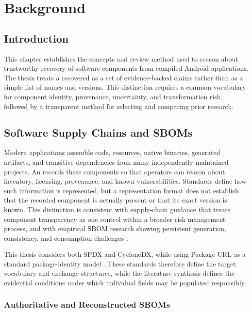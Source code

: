 \chapter[Background]{Background}
\label{ch:master-background}

\section{Introduction}

This chapter establishes the concepts and review method used to reason about
trustworthy recovery of software components from compiled Android
applications. The thesis treats a recovered \SBOM as a set of evidence-backed
claims rather than as a simple list of names and versions. This distinction
requires a common vocabulary for component identity, provenance, uncertainty,
and transformation risk, followed by a transparent method for selecting and
comparing prior research.

\section{Software Supply Chains and SBOMs}

Modern applications assemble code, resources, native binaries, generated
artifacts, and transitive dependencies from many independently maintained
projects. An \SBOM records these components so that operators can reason about
inventory, licensing, provenance, and known vulnerabilities. Standards define
how such information is represented, but a representation format does not
establish that the recorded component is actually present or that its exact
version is known. This distinction is consistent with supply-chain guidance
that treats component transparency as one control within a broader risk
management process, and with empirical SBOM research showing persistent
generation, consistency, and consumption challenges
\cite{ntia2021minimum,nist2022scrm,xia2023sbom}.

This thesis considers both SPDX and CycloneDX, while using Package URL as a
standard package-identity model
\cite{spdxSpecification,cyclonedxSpecification,packageUrlSpecification}.
These standards therefore define the target vocabulary and exchange
structures, while the literature synthesis defines the evidential conditions
under which individual fields may be populated responsibly.

\subsection{Authoritative and Reconstructed SBOMs}

